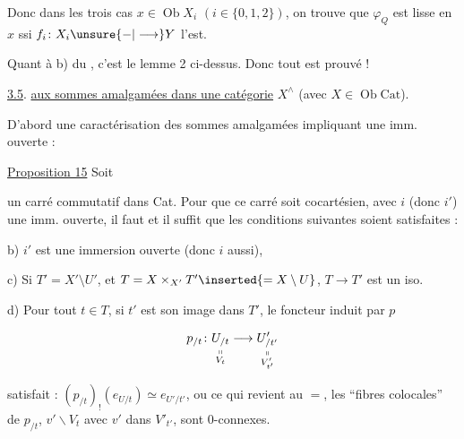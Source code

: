 
Donc  dans  les trois cas $x\in\operatorname{Ob}X_i$ $(i\in\{0,1,2\})$, on trouve que $\varphi_Q$ est lisse en $x$ ssi $f_i\colon X_i\unsure{-|\longrightarrow}Y$ l'est.

Quant à b) du ,  c'est le lemme 2 ci-dessus. Donc tout est prouvé !

\uline{3.5}. \uline{ aux sommes amalgamées dans une catégorie} $X^\wedge$ (avec $X\in\operatorname{Ob}\mathrm{Cat}$).

D'abord une caractérisation des sommes amalgamées impliquant une imm. ouverte :

\uline{Proposition 15} Soit


un carré commutatif dans Cat. Pour que ce carré soit cocartésien, avec $i$ (donc $i'$) une imm. ouverte, il faut et il suffit que les conditions suivantes soient satisfaites :


b) $i'$ est une immersion ouverte (donc $i$ aussi),


c) Si $T'=X'\setminus U'$, et $T=X\times_{X'}T'\inserted{=X\setminus U}$, $T\longrightarrow T'$ est un iso.

d) Pour tout $t\in T$, si $t'$ est son image dans $T'$, le foncteur induit par $p$

\[
p_{/t}\colon
\underset{\substack{\shortparallel\\ V_t}}{U_{/t}}
\longrightarrow
\underset{\substack{\shortparallel\\ V'_{t'}}}{U'_{/t'}}
\]

  satisfait : $(p_{/t})_!(e_{U/t})\simeq e_{U'/t'}$, ou ce qui revient au $=$, les ``fibres colocales'' de $p_{/t}$, $v'\backslash V_t$ avec $v'$ dans $V'_{t'}$, sont $0$-connexes.

